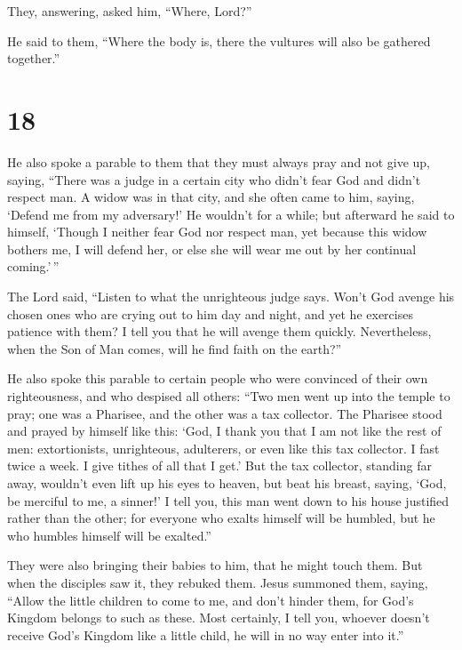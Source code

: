  They, answering, asked him, ``Where, Lord?''

He said to them, ``Where the body is, there the vultures will also be
gathered together.''

\hypertarget{section-17}{%
\section{18}\label{section-17}}

 He also spoke a parable to them that they must always pray
and not give up,  saying, ``There was a judge in a certain
city who didn't fear God and didn't respect man.  A widow
was in that city, and she often came to him, saying, `Defend me from my
adversary!'  He wouldn't for a while; but afterward he said
to himself, `Though I neither fear God nor respect man,  yet
because this widow bothers me, I will defend her, or else she will wear
me out by her continual coming.'\,''

 The Lord said, ``Listen to what the unrighteous judge says.
 Won't God avenge his chosen ones who are crying out to him
day and night, and yet he exercises patience with them?  I
tell you that he will avenge them quickly. Nevertheless, when the Son of
Man comes, will he find faith on the earth?''

 He also spoke this parable to certain people who were
convinced of their own righteousness, and who despised all others:
 ``Two men went up into the temple to pray; one was a
Pharisee, and the other was a tax collector.  The Pharisee
stood and prayed by himself like this: `God, I thank you that I am not
like the rest of men: extortionists, unrighteous, adulterers, or even
like this tax collector.  I fast twice a week. I give
tithes of all that I get.'  But the tax collector, standing
far away, wouldn't even lift up his eyes to heaven, but beat his breast,
saying, `God, be merciful to me, a sinner!'  I tell you,
this man went down to his house justified rather than the other; for
everyone who exalts himself will be humbled, but he who humbles himself
will be exalted.''

 They were also bringing their babies to him, that he might
touch them. But when the disciples saw it, they rebuked them.
 Jesus summoned them, saying, ``Allow the little children
to come to me, and don't hinder them, for God's Kingdom belongs to such
as these.  Most certainly, I tell you, whoever doesn't
receive God's Kingdom like a little child, he will in no way enter into
it.''

